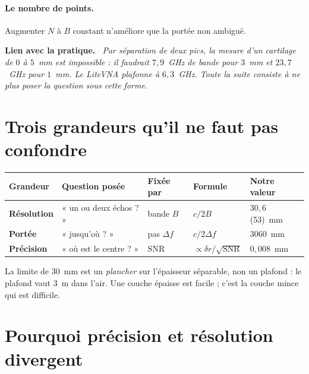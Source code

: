 \documentclass[11pt,a4paper]{article}
\newenvironment{implication}%
  {\par\medskip\begin{lrbox}{\implbox}\begin{minipage}{0.95\textwidth}%
   \textbf{Lien avec la pratique.}\itshape\ }%
  {\end{minipage}\end{lrbox}\noindent\fbox{\usebox{\implbox}}\par\medskip}
\begin{document}
\paragraph{Le nombre de points.} Augmenter $N$ à $B$ constant n'améliore que la
portée non ambiguë.

\begin{implication}
Par séparation de deux pics, la mesure d'un cartilage de $0$ à $5$~mm est
\emph{impossible} : il faudrait $7{,}9$~GHz de bande pour $3$~mm et $23{,}7$~GHz
pour $1$~mm. Le LiteVNA plafonne à $6{,}3$~GHz. Toute la suite consiste à ne
plus poser la question sous cette forme.
\end{implication}

\section{Trois grandeurs qu'il ne faut pas confondre}

\begin{table}[h]
\centering
\renewcommand{\arraystretch}{1.35}
\begin{tabular}{p{2.3cm}p{3.8cm}p{2.2cm}p{2.3cm}p{2.4cm}}
\toprule
Grandeur & Question posée & Fixée par & Formule & Notre valeur \\
\midrule
\textbf{Résolution} & « un ou deux échos ? » &
  bande $B$ & $c/2B$ & $30{,}6$ (53)~mm \\
\textbf{Portée} & « jusqu'où ? » &
  pas $\Delta f$ & $c/2\Delta f$ & $3060$~mm \\
\textbf{Précision} & « où est le centre ? » &
  $\mathrm{SNR}$ & $\propto \delta r/\sqrt{\mathrm{SNR}}$ & $0{,}008$~mm \\
\bottomrule
\end{tabular}
\end{table}

La limite de $30$~mm est un \emph{plancher} sur l'épaisseur séparable, non un
plafond : le plafond vaut $3$~m dans l'air. Une couche épaisse est facile ;
c'est la couche mince qui est difficile.

\section{Pourquoi précision et résolution divergent}
\end{document}

